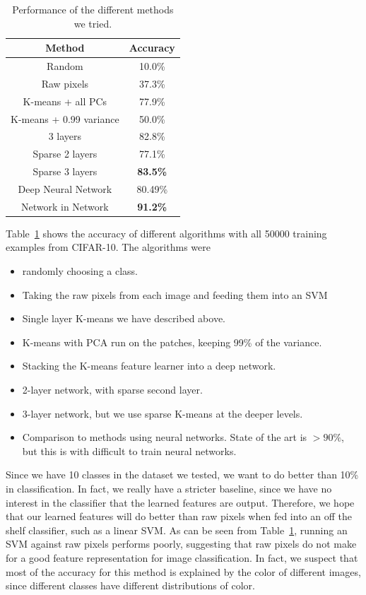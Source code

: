 \documentclass{article} %
\begin{document}
\begin{table}
  \centering
  \begin{tabular}{|c|c|}
    \hline
    \textbf{Method} & \textbf{Accuracy}\\
    \hline
    Random & 10.0\%\\
    Raw pixels & 37.3\%\\
    K-means + all PCs & 77.9\%\\
    K-means + 0.99 variance & 50.0\%\\
    3 layers & 82.8\%\\
    Sparse 2 layers & 77.1\%\\
    Sparse 3 layers & \textbf{83.5\%}\\
    \hline
    Deep Neural Network \cite{CiresanMMGS11} & 80.49\%\\
    Network in Network \cite{LinCY13} & \textbf{91.2\%}\\
    \hline
  \end{tabular}
  \caption{Performance of the different methods we tried.}
  \label{tableacc}
\end{table}

Table~\ref{tableacc} shows the accuracy of different algorithms with all 50000 training examples from CIFAR-10. The algorithms were

\begin{itemize}
\item[1.] randomly choosing a class.
\item[2.] Taking the raw pixels from each image and feeding them into an SVM
\item[3.] Single layer K-means we have described above.
\item[4.] K-means with PCA run on the patches, keeping 99\% of the variance.
\item[5.] Stacking the K-means feature learner into a deep network.
\item[6.] 2-layer network, with sparse second layer.
\item[7.] 3-layer network, but we use sparse K-means at the deeper levels.
\item[8/9.] Comparison to methods using neural networks. State of the art is $> 90\%$, but this is with difficult to train neural networks.
\end{itemize}

Since we have 10 classes in the dataset we tested, we want to do better than 10\% in classification. In fact, we really have a stricter baseline, since we have no interest in the classifier that the learned features are output. Therefore, we hope that our learned features will do better than raw pixels when fed into an off the shelf classifier, such as a linear SVM. As can be seen from Table~\ref{tableacc}, running an SVM against raw pixels performs poorly, suggesting that raw pixels do not make for a good feature representation for image classification. In fact, we suspect that most of the accuracy for this method is explained by the color of different images, since different classes have different distributions of color.
\end{document}
